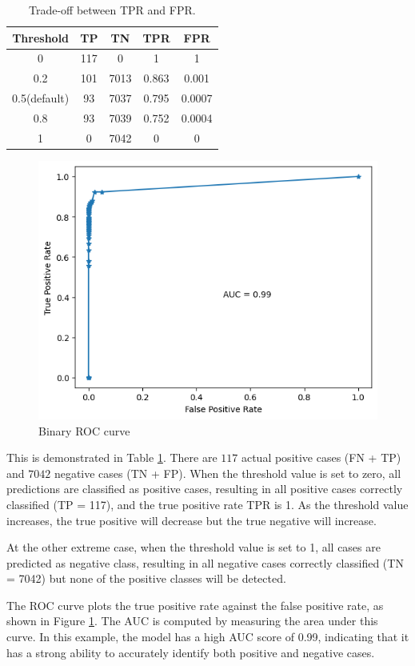 \begin{table}[!h]
\centering
\begin{tabular}{|c|c|c|c|c|}
  \hline
  Threshold & TP & TN & TPR & FPR \\
  \hline
  0   & 117 & 0 & 1 & 1 \\
  \hline
  0.2 & 101 & 7013 & 0.863 & 0.001 \\
  \hline
  0.5(default) & 93 & 7037 & 0.795 & 0.0007 \\
  \hline
  0.8 & 93 & 7039 & 0.752 & 0.0004 \\
  \hline
  1 & 0 & 7042 & 0 & 0 \\
  \hline
\end{tabular}
\caption{Trade-off between TPR and FPR.}\label{tb:roc}
\end{table}

\begin{figure}[!h]
  \centering
  \includegraphics[width=7.5 cm]{auc.png}
  \caption{Binary ROC curve}
  \label{fig:auc}
\end{figure}

This is demonstrated in Table \ref{tb:roc}. There are $117$ actual positive cases (FN + TP) and $7042$ negative cases (TN + FP). When the threshold value is set to zero, all predictions are classified as positive cases, resulting in all positive cases correctly classified (TP = 117), and the true positive rate TPR is 1. As the threshold value increases, the true positive will decrease but the true negative will increase.

At the other extreme case, when the threshold value is set to 1, all cases are predicted as negative class, resulting in all negative cases correctly classified (TN = 7042) but none of the positive classes will be detected.

The ROC curve plots the true positive rate against the false positive rate, as shown in Figure \ref{fig:auc}. The AUC is computed by measuring the area under this curve. In this example, the model has a high AUC score of 0.99, indicating that it has a strong ability to accurately identify both positive and negative cases.


